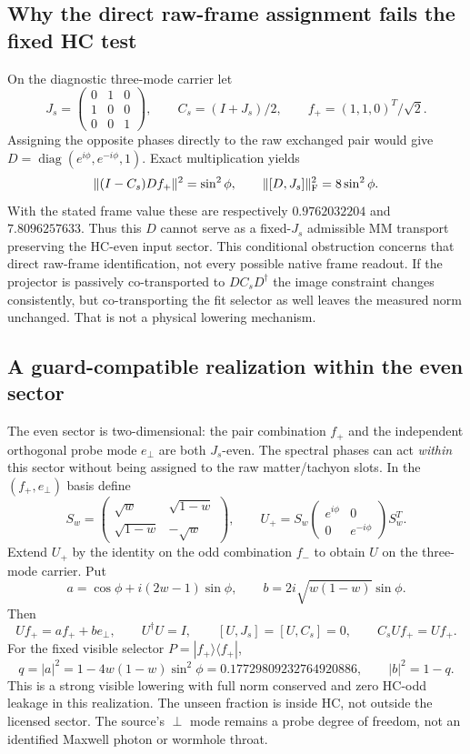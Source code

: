 \documentclass[11pt,a4paper]{article}
\begin{document}
\subsection{Why the direct raw-frame assignment fails the fixed HC test}

On the diagnostic three-mode carrier let
\[
 J_s=\begin{pmatrix}0&1&0\\1&0&0\\0&0&1\end{pmatrix},
 \qquad C_s=(I+J_s)/2,
 \qquad f_+=(1,1,0)^T/\sqrt2.
\]
Assigning the opposite phases directly to the raw exchanged pair
would give $D=\operatorname{diag}(e^{i\phi},e^{-i\phi},1)$.
Exact multiplication yields
\[
 \|(I-C_s)Df_+\|^2=\sin^2\phi,
 \qquad \|[D,J_s]\|_{\rm F}^2=8\sin^2\phi.
\]
With the stated frame value these are respectively
$0.9762032204$ and $7.8096257633$. Thus this $D$ cannot serve as
a fixed-$J_s$ admissible MM transport preserving the HC-even input
sector. This conditional obstruction concerns that direct raw-frame
identification, not every possible native frame readout. If the
projector is passively co-transported to $DC_sD^\dagger$ the image
constraint changes consistently, but co-transporting the fit
selector as well leaves the measured norm unchanged. That is not
a physical lowering mechanism.

\subsection{A guard-compatible realization within the even sector}

The even sector is two-dimensional: the pair combination $f_+$
and the independent orthogonal probe mode $e_\perp$ are both
$J_s$-even. The spectral phases can act \emph{within} this sector
without being assigned to the raw matter/tachyon slots. In the
$(f_+,e_\perp)$ basis define
\[
 S_w=\begin{pmatrix}\sqrt w&\sqrt{1-w}\\
                     \sqrt{1-w}&-\sqrt w\end{pmatrix},
 \qquad
 U_+=S_w\begin{pmatrix}e^{i\phi}&0\\0&e^{-i\phi}\end{pmatrix}S_w^T.
\]
Extend $U_+$ by the identity on the odd combination $f_-$ to
obtain $U$ on the three-mode carrier. Put
\[
 a=\cos\phi+i(2w-1)\sin\phi,
 \qquad b=2i\sqrt{w(1-w)}\sin\phi.
\]
Then
\[
 Uf_+=a f_++b e_\perp,\qquad
 U^\dagger U=I,\qquad [U,J_s]=[U,C_s]=0,
 \qquad C_sUf_+=Uf_+.
\]
For the fixed visible selector $P=|f_+\rangle\langle f_+|$,
\[
 \boxed{\displaystyle
 q=|a|^2=1-4w(1-w)\sin^2\phi
      =0.17729809232764920886,\qquad |b|^2=1-q.}
\]
This is a strong visible lowering with full norm conserved and
zero HC-odd leakage in this realization. The unseen fraction is
inside HC, not outside the licensed sector. The source's $\perp$
mode remains a probe degree of freedom, not an identified Maxwell
photon or wormhole throat.
\end{document}
